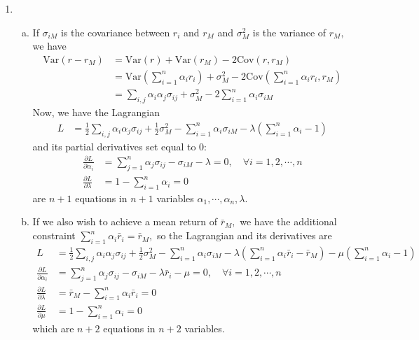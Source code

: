 \documentclass{article}
\newcommand{\var}{\mathrm{Var}}
\newcommand{\cov}{\mathrm{Cov}}
\begin{document}
\begin{enumerate}
\begin{enumerate}[(a)]
		\end{enumerate}

	\item 
		\begin{enumerate}[(a)]
			\item 
				\begin{soln}
					If $\sigma_{iM}$ is the covariance between $r_i$ and $r_M$ and $\sigma_M^2$ is the variance of $r_M,$ we have
					\begin{align*}
						\var(r-r_M) &= \var(r)+\var(r_M) - 2\cov(r, r_M) \\
						&= \var\left( \sum_{i=1}^{n} \alpha_i r_i \right) + \sigma_M^2 - 2\cov\left( \sum_{i=1}^{n} \alpha_i r_i, r_M \right) \\
						&= \sum_{i, j}^{}\alpha_i\alpha_j \sigma_{ij} + \sigma_M^2 - 2\sum_{i=1}^{n} \alpha_i \sigma_{iM}
					\end{align*}
					Now, we have the Lagrangian
					\begin{align*}
						L &= \frac{1}{2} \sum_{i, j}^{}\alpha_i\alpha_j \sigma_{ij} + \frac{1}{2} \sigma_M^2 - \sum_{i=1}^{n} \alpha_i \sigma_{iM} - \lambda\left( \sum_{i=1}^{n} \alpha_i - 1 \right)
					\end{align*}
					and its partial derivatives set equal to 0:
					\begin{align*}
						\frac{\partial L}{\partial \alpha_i} &= \sum_{j=1}^{n} \alpha_j \sigma_{ij} - \sigma_{iM} - \lambda = 0, \quad\forall i=1, 2, \cdots, n \\
						\frac{\partial L}{\partial \lambda} &= 1-\sum_{i=1}^{n} \alpha_i = 0
					\end{align*}
					are $n+1$ equations in $n+1$ variables $\alpha_1, \cdots, \alpha_n, \lambda.$
				\end{soln}

			\item
				\begin{soln}
					If we also wish to achieve a mean return of $\bar r_M,$ we have the additional constraint $\sum_{i=1}^{n} \alpha_i \bar r_i = \bar r_M,$ so the Lagrangian and its derivatives are
					\begin{align*}
						L &= \frac{1}{2} \sum_{i, j}^{}\alpha_i \alpha_j \sigma_{ij} + \frac{1}{2}\sigma_M^2 - \sum_{i=1}^{n} \alpha_i \sigma_{iM} - \lambda\left( \sum_{i=1}^{n} \alpha_i \bar r_i - \bar r_M \right) - \mu\left( \sum_{i=1}^{n} \alpha_i - 1 \right) \\
						\frac{\partial L}{\partial \alpha_i} &= \sum_{j=1}^{n} \alpha_j \sigma_{ij} - \sigma_{iM} - \lambda \bar r_i - \mu = 0, \quad\forall i=1, 2, \cdots, n \\
						\frac{\partial L}{\partial \lambda} &= \bar r_M - \sum_{i=1}^{n} \alpha_i \bar r_i = 0 \\
						\frac{\partial L}{\partial \mu} &= 1-\sum_{i=1}^{n} \alpha_i = 0
					\end{align*}
					which are $n+2$ equations in $n+2$ variables.
				\end{soln}
				

\end{enumerate}
\end{enumerate}
\end{document}
